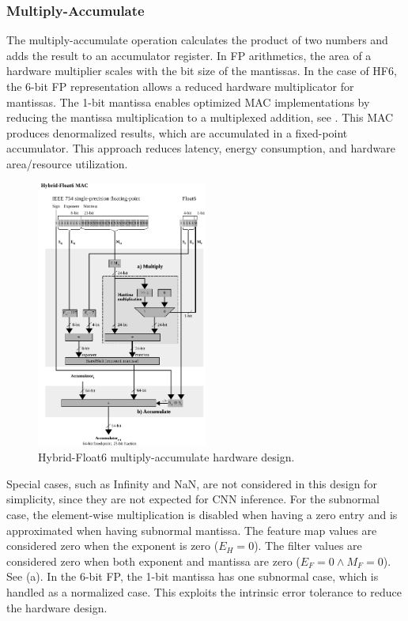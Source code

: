 \subsubsection{\textbf{Multiply-Accumulate}}
The multiply-accumulate operation calculates the product of two numbers and adds the result to an accumulator register. In FP arithmetics, the area of a hardware multiplier scales with the bit size of the mantissas. In the case of HF6, the 6-bit FP representation allows a reduced hardware multiplicator for mantissas. The 1-bit mantissa enables optimized MAC implementations by reducing the mantissa multiplication to a multiplexed addition, see . This MAC produces denormalized results, which are accumulated in a fixed-point accumulator. This approach reduces latency, energy consumption, and hardware area/resource utilization.

\begin{figure}[t!]
	\centering
	\includegraphics[width=0.5\textwidth]{./chapters/cnn_accelerator/figures/multiplier.pdf}
	\caption{Hybrid-Float6 multiply-accumulate hardware design.}
	\label{fig:multiplier}
\end{figure}

Special cases, such as Infinity and NaN, are not considered in this design for simplicity, since they are not expected for CNN inference. For the subnormal case, the element-wise multiplication is disabled when having a zero entry and is approximated when having subnormal mantissa. The feature map values are considered zero when the exponent is zero ($E_H=0$). The filter values are considered zero when both exponent and mantissa are zero ($E_F=0\land M_F=0$). See (a). In the 6-bit FP, the 1-bit mantissa has one subnormal case, which is handled as a normalized case. This exploits the intrinsic error tolerance to reduce the hardware design.

